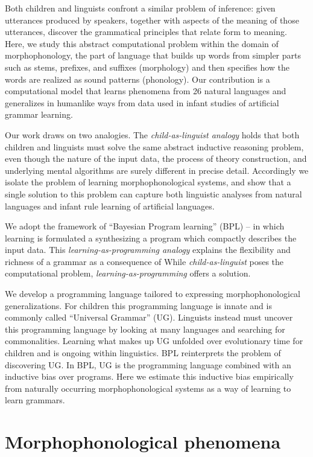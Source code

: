 \documentclass{article}
\begin{document}
Both children and linguists confront a similar problem of inference:
given utterances produced by speakers, together with aspects of the
meaning of those utterances, discover the grammatical principles that
relate form to meaning. Here, we study this abstract computational
problem within the domain of morphophonology, the part of language
that builds up words from simpler parts such as stems, prefixes, and
suffixes (morphology) and then specifies how the words are realized as
sound patterns (phonology).  Our contribution is a computational model
that learns phenomena from 26 natural languages and generalizes in
humanlike ways from data used in infant studies of artificial grammar
learning.

Our work draws on two analogies. The \emph{child-as-linguist analogy}
holds that both children and linguists must solve the same abstract
inductive reasoning problem, even though the nature of the input data,
the process of theory construction, and underlying mental algorithms
are surely different in precise detail. Accordingly we isolate the
problem of learning morphophonological systems, and show that a single
solution to this problem can capture both linguistic analyses from
natural languages and infant rule learning of artificial languages.

We adopt the framework of ``Bayesian Program learning'' (BPL) -- in
which learning is formulated a synthesizing a program which compactly
describes the input data. This \emph{learning-as-programming analogy}
explains the flexibility and richness of a grammar
as a consequence of 
While \emph{child-as-linguist} poses the
computational problem, \emph{learning-as-programming} offers a
solution.

We develop a programming language tailored to expressing
morphophonological generalizations.
For children this programming language is innate and is
commonly called ``Universal Grammar'' (UG). Linguists instead must
uncover this programming language by looking at many languages and
searching for commonalities. Learning what makes up UG unfolded over
evolutionary time for children and is ongoing within linguistics.  BPL
reinterprets the problem of discovering UG.  In BPL, UG is the
programming language combined with an inductive bias over programs.
Here we estimate this inductive bias empirically from naturally
occurring morphophonological systems as a way of learning to learn
grammars.

\section{Morphophonological phenomena}
\end{document}
